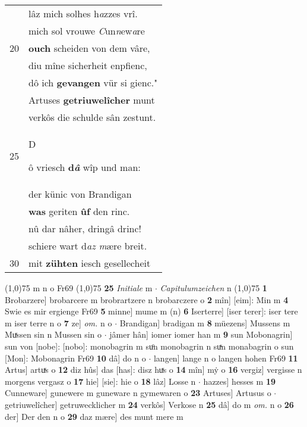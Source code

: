 \documentclass[8pt,a4paper,notitlepage]{article}
\begin{document}
\begin{table}[ht]
\begin{minipage}[t]{0.5\linewidth}
\begin{tabular}{rl}
 & lâz mich solhes h\textit{a}zzes vrî.\\ 
 & mich sol vrouwe \textit{C}un\textit{n}ew\textit{a}re\\ 
20 & \textbf{ouch} scheiden von dem vâre,\\ 
 & diu mîne sicherheit enpfienc,\\ 
 & dô ich \textbf{gevangen} vür si gienc."\\ 
 & Artuses \textbf{getriuwelîcher} munt\\ 
 & verkôs die schulde sân zestunt.\\ 
25 & \begin{large}D\end{large}ô vriesch \textbf{d\textit{â}} wîp und man:\\ 
 & der künic von Brandigan\\ 
 & \textbf{was} geriten \textbf{ûf} den rinc.\\ 
 & nû dar nâher, dringâ drinc!\\ 
 & schiere wart d\textit{az m}ære breit.\\ 
30 & mit \textbf{zühten} iesch gesellecheit\\ 
\end{tabular}
\scriptsize
\line(1,0){75} \newline
m n o Fr69 \newline
\line(1,0){75} \newline
\textbf{25} \textit{Initiale} m   $\cdot$ \textit{Capitulumzeichen} n  \newline
\line(1,0){75} \newline
\textbf{1} Brobarzere] brobarcere m brobrartzere n brobarczere o \textbf{2} mîn] [eim]: Min m \textbf{4} Swie es mir ergienge Fr69 \textbf{5} minne] mume m (n) \textbf{6} Iserterre] [iser terer]: iser tere m iser terre n o \textbf{7} ze] \textit{om.} n o  $\cdot$ Brandigan] bradigan m \textbf{8} müezens] Mussens m Muͯssen sin n Mussen sin o  $\cdot$ jâmer hân] iomer iomer han m \textbf{9} sun Mobonagrin] sun von [nobe]: [nobo]: monobagrin m suͦn monobagrin n suͯn monabagrin o sun [Mon]: Mobonagrin Fr69 \textbf{10} dâ] do n o  $\cdot$ langen] lange n o langen hohen Fr69 \textbf{11} Artus] artuͯs o \textbf{12} diz hûs] das [has]: disz huͯs o \textbf{14} mîn] mẏ o \textbf{16} vergiz] vergisse n morgens vergasz o \textbf{17} hie] [sie]: hie o \textbf{18} lâz] Losse n  $\cdot$ hazzes] hesses m \textbf{19} Cunneware] gunewere m guneware n gymewaren o \textbf{23} Artuses] Artusus o  $\cdot$ getriuwelîcher] getruwecklicher m \textbf{24} verkôs] Verkose n \textbf{25} dâ] do m \textit{om.} n o \textbf{26} der] Der den n o \textbf{29} daz mære] des munt mere m \newline
\end{minipage}
\end{table}
\end{document}
